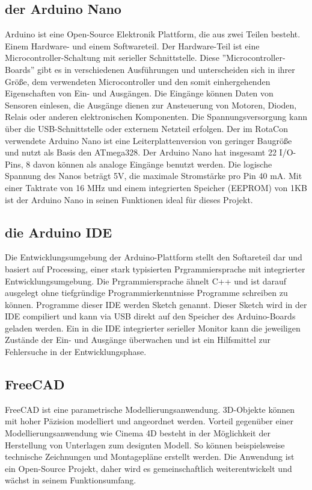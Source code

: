 \documentclass[11pt, titlepage, fleqn]{report}
\begin{document}
			\subsection{der Arduino Nano}
			\label{sec:Nano}
				Arduino ist eine Open-Source Elektronik Plattform, die aus zwei Teilen besteht. Einem Hardware- und einem Softwareteil. 
				Der Hardware-Teil ist eine Microcontroller-Schaltung mit serieller Schnittstelle. Diese ''Microcontroller-Boards'' gibt es in 
				verschiedenen Ausführungen und unterscheiden sich in ihrer Größe, dem verwendeten Microcontroller und den somit einhergehenden 
				Eigenschaften von Ein- und Ausgängen. Die Eingänge können Daten von Sensoren einlesen, die Ausgänge dienen zur Ansteuerung von Motoren, Dioden, 
				Relais oder anderen elektronischen Komponenten. Die Spannungsversorgung kann über die USB-Schnittstelle oder externem Netzteil erfolgen.
				Der im RotaCon verwendete Arduino Nano ist eine Leiterplattenversion von geringer Baugröße und nutzt als Basis den ATmega328.
				Der Arduino Nano hat insgesamt 22 I/O-Pins, 8 davon können als analoge Eingänge benutzt werden. Die logische Spannung des Nanos beträgt 5V, die maximale Stromstärke pro Pin 40 mA.
				Mit einer Taktrate von 16 MHz und einem integrierten Speicher (EEPROM) von 1KB ist der Arduino Nano in seinen Funktionen ideal für dieses Projekt.
			\subsection{die Arduino IDE}
			\label{sec:Arduino IDE}
				Die Entwicklungsumgebung der Arduino-Plattform stellt den Softareteil dar und basiert auf Processing, einer stark typisierten Prgrammiersprache 
				mit integrierter Entwicklungsumgebung. Die Prgrammiersprache ähnelt C++ und ist darauf ausgelegt ohne tiefgründige Programmierkenntnisse 
				Programme schreiben zu können. Programme dieser IDE werden Sketch genannt. Dieser Sketch wird in der IDE compiliert und kann via USB direkt auf den Speicher 
				des Arduino-Boards geladen werden. Ein in die IDE integrierter serieller Monitor kann die jeweiligen Zustände der Ein- und Ausgänge überwachen und 
				ist ein Hilfsmittel zur Fehlersuche in der Entwicklungsphase.
			\subsection{FreeCAD}
			\label{sec:FreeCAD}
				FreeCAD ist eine parametrische Modellierungsanwendung. 3D-Objekte können mit hoher Päzision modelliert und angeordnet 
				werden. Vorteil gegenüber einer Modellierungsanwendung wie Cinema 4D besteht in der Möglichkeit der Herstellung von Unterlagen 
				zum designten Modell. So können beispielsweise technische Zeichnungen und Montagepläne erstellt werden. 
				Die Anwendung ist ein Open-Source Projekt, daher wird es gemeinschaftlich weiterentwickelt und wächst in seinem Funktionsumfang.
\end{document}
